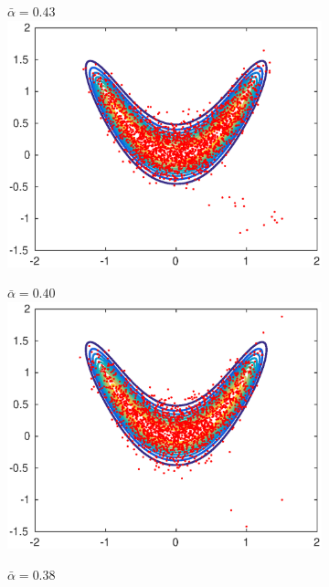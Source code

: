 \documentclass{beamer}
\begin{document}
\begin{frame}
\begin{figure}[t]
		\begin{subfigure}{0.32\linewidth}
			\centering
			\tiny{$\bar \alpha = 0.43$}
			\includegraphics[width=1\linewidth]{../plots/MHvsRAM/RAM_small}
		\end{subfigure}
		\begin{subfigure}{0.32\linewidth}
			\centering
			\tiny{$\bar \alpha = 0.40$}
			\includegraphics[width=1\linewidth]{../plots/MHvsRAM/RAM_medium}
		\end{subfigure}
		\begin{subfigure}{0.32\linewidth}
			\centering
			\tiny{$\bar \alpha = 0.38$}

\end{subfigure}
\end{figure}
\end{frame}
\end{document}
